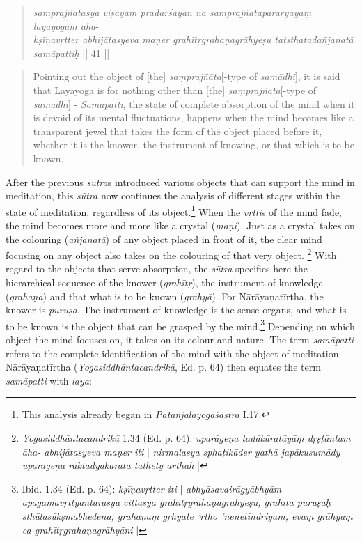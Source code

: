 \begin{quote}
\textit{samprajñātasya viṣayaṃ pradarśayan na samprajñātāpararyāyaṃ layayogam āha}-\\
\textit{kṣīṇavṛtter abhijātasyeva maṇer grahītṛgrahaṇagrāhyeṣu tatsthatadañjanatā samāpattiḥ} || 41 ||
\end{quote}
\begin{quote}
Pointing out the object of [the] \textit{saṃprajñāta}[-type of \textit{samādhi}], it is said that Layayoga is for nothing other than [the] \textit{saṃprajñāta}[-type of \textit{samādhi}] - 
\textit{Samāpatti}, the state of complete absorption of the mind when it is devoid of its mental fluctuations, happens when the mind becomes like a transparent jewel that takes the form of the object placed before it, whether it is the knower, the instrument of knowing, or that which is to be known.
\end{quote}

After the previous \textit{sūtra}s introduced various objects that can support the mind in meditation, this \textit{sūtra} now continues the analysis of different stages within the state of meditation, regardless of its object.\footnote{This analysis already began in \textit{Pātañjalayogaśāstra} I.17.} When the \textit{vṛtti}s of the mind fade, the mind becomes more and more like a crystal (\textit{maṇi}). Just as a crystal takes on the colouring (\textit{añjanatā}) of any object placed in front of it, the clear mind focusing on any object also takes on the colouring of that very object. \footnote{\textit{Yogasiddhāntacandrikā} 1.34 (Ed. p. 64): \textit{uparāgeṇa tadākāratāyāṃ dṛṣṭāntam āha- abhijātasyeva maṇer iti} | \textit{nirmalasya sphaṭikāder yathā japākusumādy uparāgeṇa raktādyākāratā tathety arthaḥ} |} With regard to the objects that serve absorption, the \textit{sūtra} specifies here the hierarchical sequence of the knower (\textit{grahītṛ}), the instrument of knowledge (\textit{grahaṇa}) and that what is to be known (\textit{grahyā}). For Nārāyaṇatīrtha, the knower is \textit{puruṣa}. The instrument of knowledge is the sense organs, and what is to be known is the object that can be grasped by the mind.\footnote{Ibid. 1.34 (Ed. p. 64): \textit{kṣīṇavṛtter iti} | \textit{abhyāsavairāgyābhyām apagamavṛttyantarasya cittasya grahītṛgrahaṇagrāhyeṣu, grahītā puruṣaḥ sthūlasūkṣmabhedena, grahaṇaṃ gṛhyate 'rtho 'nenetīndriyam, evaṃ grāhyaṃ ca grahītṛgrahaṇagrāhyāni} |} Depending on which object the mind focuses on, it takes on its colour and nature. The term \textit{samāpatti} refers to the complete identification of the mind with the object of meditation. Nārāyaṇatīrtha (\textit{Yogasiddhāntacandrikā}, Ed. p. 64) then equates the term \textit{samāpatti} with \textit{laya}:

